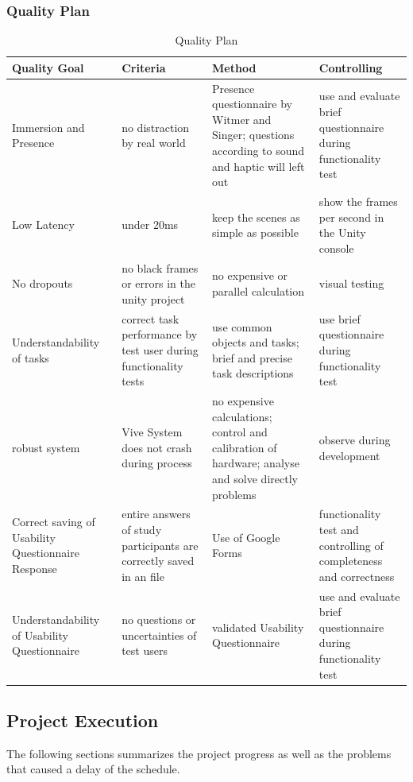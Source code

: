 \subsubsection{Quality Plan}\label{sec:PMQualityPlan}
\begin{table}[H]
	\centering
	\begin{tabular}{|p{3cm}|p{3 cm}|p{3.5 cm}|p{3.5cm}|}
		\hline
		\Absatzbox{}
		\textbf{Quality Goal}&	\textbf{Criteria} &\textbf{Method} &	\textbf{Controlling}\\ \hline
	Immersion and Presence	& no distraction by real world &	Presence questionnaire by Witmer and Singer; questions according to sound and haptic will left out	& use and evaluate brief questionnaire during functionality test\\ \hline	
Low Latency	& under $20$ms &	keep the scenes as simple as possible & show the frames per second in the Unity console\\ \hline		
No dropouts	& no black frames or errors in the unity project & no expensive or parallel calculation & visual testing\\ \hline	
Understandability of tasks	& correct task performance by test user during functionality tests & use common objects and tasks; brief and precise task descriptions & use brief questionnaire during functionality test\\ \hline	
robust system & Vive System does not crash during process & no expensive calculations; control and calibration of hardware; analyse and solve directly problems & observe during development
\\ \hline
Correct saving of Usability Questionnaire Response & entire answers of study participants are correctly saved in an file & Use of Google Forms & functionality test and controlling of completeness and correctness\\ \hline
Understandability of Usability Questionnaire & no questions or uncertainties of test users& validated Usability Questionnaire & use and evaluate brief questionnaire during functionality test\\ \hline
	\end{tabular}
	\caption[]{Quality Plan}
	\label{tab:Qaulity Plan}
\end{table}
\subsection{Project Execution} \label{sec:ProjectExecution}
The following sections summarizes the project progress as well as the problems that caused a delay of the schedule.
